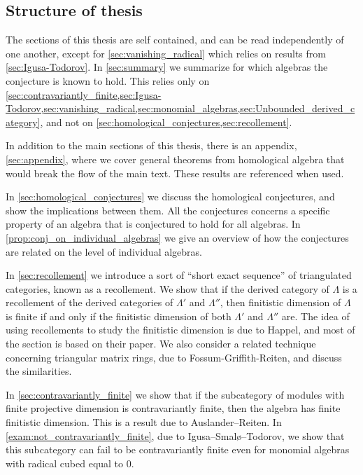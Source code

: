 \subsection*{Structure of thesis}
The sections of this thesis are self contained, and can be read independently of one another, except for \cref{sec:vanishing_radical} which relies on results from \cref{sec:Igusa-Todorov}. In \cref{sec:summary} we summarize for which algebras the conjecture is known to hold. This relies only on \cref{sec:contravariantly_finite,sec:Igusa-Todorov,sec:vanishing_radical,sec:monomial_algebras,sec:Unbounded_derived_category}, and not on \cref{sec:homological_conjectures,sec:recollement}.

In addition to the main sections of this thesis, there is an appendix, \cref{sec:appendix}, where we cover general theorems from homological algebra that would break the flow of the main text. These results are referenced when used.

In \cref{sec:homological_conjectures} we discuss the homological conjectures, and show the implications between them. All the conjectures concerns a specific property of an algebra that is conjectured to hold for all algebras. In \cref{prop:conj_on_individual_algebras} we give an overview of how the conjectures are related on the level of individual algebras.

In \cref{sec:recollement} we introduce a sort of ``short exact sequence'' of triangulated categories, known as a recollement. We show that if the derived category of $\Lambda$ is a recollement of the derived categories of $\Lambda'$ and $\Lambda''$, then finitistic dimension of $\Lambda$ is finite if and only if the finitistic dimension of both $\Lambda'$ and $\Lambda''$ are. The idea of using recollements to study the finitistic dimension is due to Happel, and most of the section is based on their paper\cite{Hap93}. We also consider a related technique concerning triangular matrix rings, due to Fossum-Griffith-Reiten\cite{FGR75}, and discuss the similarities.

In \cref{sec:contravariantly_finite} we show that if the subcategory of modules with finite projective dimension is contravariantly finite, then the algebra has finite finitistic dimension. This is a result due to Auslander--Reiten\cite{AR91}. In \cref{exam:not_contravariantly_finite}, due to Igusa--Smalø--Todorov\cite{IST90}, we show that this subcategory can fail to be contravariantly finite even for monomial algebras with radical cubed equal to 0. 

